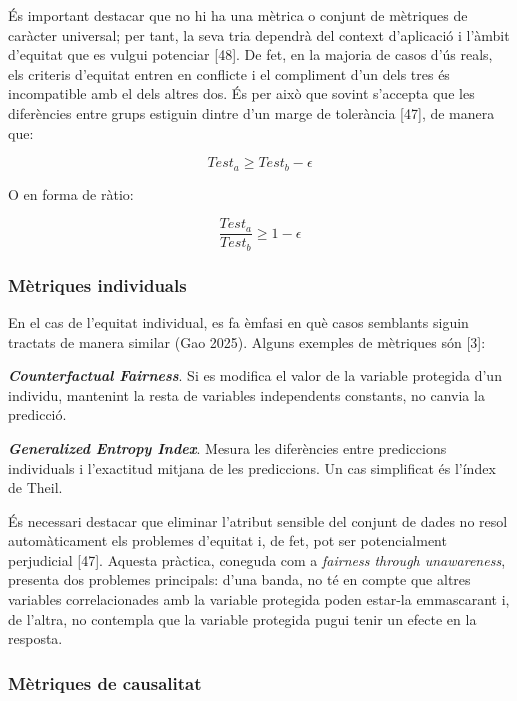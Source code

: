 \documentclass[CAT]{TFUOC}%
\begin{document}
És important destacar que no hi ha una mètrica o conjunt de mètriques de caràcter universal; per tant, la seva tria dependrà del context d'aplicació i l'àmbit d'equitat que es vulgui potenciar {[}48{]}. De fet, en la majoria de casos d'ús reals, els criteris d'equitat entren en conflicte i el compliment d'un dels tres és incompatible amb el dels altres dos. És per això que sovint s'accepta que les diferències entre grups estiguin dintre d'un marge de tolerància {[}47{]}, de manera que:

\begin{equation}
Test_a \geq Test_b - \epsilon
\end{equation}

O en forma de ràtio:

\begin{equation}
\frac{Test_a}{Test_b} \geq 1 - \epsilon
\end{equation}

\subsubsection{Mètriques individuals}\label{muxe8triques-individuals}

En el cas de l'equitat individual, es fa èmfasi en què casos semblants siguin tractats de manera similar (Gao 2025). Alguns exemples de mètriques són {[}3{]}:

\bigskip

\textbf{\emph{Counterfactual Fairness}}. Si es modifica el valor de la variable protegida d'un individu, mantenint la resta de variables independents constants, no canvia la predicció.

\textbf{\emph{Generalized Entropy Index}}. Mesura les diferències entre prediccions individuals i l'exactitud mitjana de les prediccions. Un cas simplificat és l'índex de Theil.

\bigskip

És necessari destacar que eliminar l'atribut sensible del conjunt de dades no resol automàticament els problemes d'equitat i, de fet, pot ser potencialment perjudicial {[}47{]}. Aquesta pràctica, coneguda com a \emph{fairness through unawareness}, presenta dos problemes principals: d'una banda, no té en compte que altres variables correlacionades amb la variable protegida poden estar-la emmascarant i, de l'altra, no contempla que la variable protegida pugui tenir un efecte en la resposta.

\subsubsection{Mètriques de causalitat}\label{muxe8triques-de-causalitat}
\end{document}
